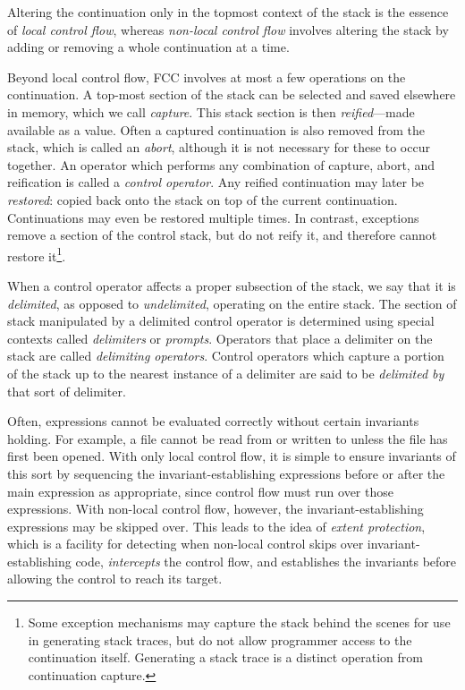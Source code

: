 \documentclass[11pt]{article}
\begin{document}
Altering the continuation only in the topmost context of the stack is the essence of \emph{local control flow}, whereas \emph{non-local control flow} involves altering the stack by adding or removing a whole continuation at a time.

Beyond local control flow, FCC involves at most a few operations on the continuation.
A top-most section of the stack can be selected and saved elsewhere in memory, which we call \emph{capture}.
This stack section is then \emph{reified}---made available as a value.
Often a captured continuation is also removed from the stack, which is called an \emph{abort}, although it is not necessary for these to occur together.
An operator which performs any combination of capture, abort, and reification is called a \emph{control operator}.
Any reified continuation may later be \emph{restored}: copied back onto the stack on top of the current continuation.
Continuations may even be restored multiple times.
In contrast, exceptions remove a section of the control stack, but do not reify it, and therefore cannot restore it\footnote{Some exception mechanisms may capture the stack behind the scenes for use in generating stack traces, but do not allow programmer access to the continuation itself. Generating a stack trace is a distinct operation from continuation capture.}.

When a control operator affects a proper subsection of the stack, we say that it is \emph{delimited}, as opposed to \emph{undelimited}, operating on the entire stack.
The section of stack manipulated by a delimited control operator is determined using special contexts called \emph{delimiters} or \emph{prompts}.
Operators that place a delimiter on the stack are called \emph{delimiting operators}.
Control operators which capture a portion of the stack up to the nearest instance of a delimiter are said to be \emph{delimited by} that sort of delimiter.

Often, expressions cannot be evaluated correctly without certain invariants holding.
For example, a file cannot be read from or written to unless the file has first been opened.
With only local control flow, it is simple to ensure invariants of this sort by sequencing the invariant-establishing expressions before or after the main expression as appropriate, since control flow must run over those expressions.
With non-local control flow, however, the invariant-establishing expressions may be skipped over.
This leads to the idea of \emph{extent protection}, which is a facility for detecting when non-local control skips over invariant-establishing code, \emph{intercepts} the control flow, and establishes the invariants before allowing the control to reach its target.
\end{document}
